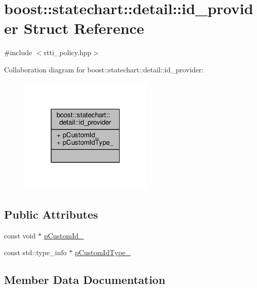 \hypertarget{structboost_1_1statechart_1_1detail_1_1id__provider}{}\section{boost\+:\+:statechart\+:\+:detail\+:\+:id\+\_\+provider Struct Reference}
\label{structboost_1_1statechart_1_1detail_1_1id__provider}


{\ttfamily \#include $<$rtti\+\_\+policy.\+hpp$>$}



Collaboration diagram for boost\+:\+:statechart\+:\+:detail\+:\+:id\+\_\+provider\+:
\nopagebreak
\begin{figure}[H]
\begin{center}
\leavevmode
\includegraphics[width=181pt]{structboost_1_1statechart_1_1detail_1_1id__provider__coll__graph}
\end{center}
\end{figure}
\subsection*{Public Attributes}
\begin{DoxyCompactItemize}
\item 
const void $\ast$ \mbox{\hyperlink{structboost_1_1statechart_1_1detail_1_1id__provider_ab225b786f1b5e3804a5e9cddc066bd4b}{p\+Custom\+Id\+\_\+}}
\item 
const std\+::type\+\_\+info $\ast$ \mbox{\hyperlink{structboost_1_1statechart_1_1detail_1_1id__provider_ae107cfa5cafc5282feb7636b2dc4ad74}{p\+Custom\+Id\+Type\+\_\+}}
\end{DoxyCompactItemize}


\subsection{Member Data Documentation}
\mbox{\label{structboost_1_1statechart_1_1detail_1_1id__provider_ab225b786f1b5e3804a5e9cddc066bd4b}} 
